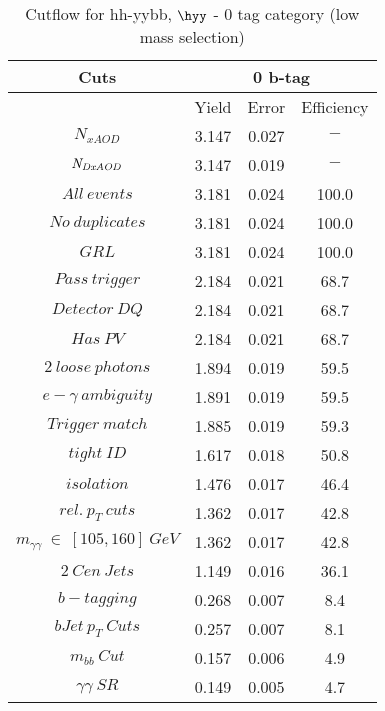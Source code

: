 \begin{table}\footnotesize
\begin{center}
\caption{Cutflow for hh-yybb, $\hyy$ - 0 tag category (low mass selection)}

\begin{tabular}{|c|c|c|c|}
\hline
Cuts& \multicolumn{3}{c|}{0 b-tag} \\ \hline
&Yield&Error&Efficiency\\ \hline
$N_{xAOD}$ & 3.147&0.027 &$-$ \\
\hline
$\it{N}_{DxAOD}$ & 3.147&0.019 &$-$ \\
\hline
$All\ events$ & 3.181&0.024 &100.0 \\
\hline
$No\ duplicates$ & 3.181&0.024 &100.0 \\
\hline
$GRL$ & 3.181&0.024 &100.0 \\
\hline
$Pass\ trigger$ & 2.184&0.021 &68.7 \\
\hline
$Detector\ DQ$ & 2.184&0.021 &68.7 \\
\hline
$Has\ PV$ & 2.184&0.021 &68.7 \\
\hline
$2\ loose\ photons$ & 1.894&0.019 &59.5 \\
\hline
$e-\gamma\ ambiguity$ & 1.891&0.019 &59.5 \\
\hline
$Trigger\ match$ & 1.885&0.019 &59.3 \\
\hline
$tight\ ID$ & 1.617&0.018 &50.8 \\
\hline
$isolation$ & 1.476&0.017 &46.4 \\
\hline
$rel.\ p_{T}\ cuts$ & 1.362&0.017 &42.8 \\
\hline
$m_{\gamma\gamma}\ \in\ [105,160]\ GeV$ & 1.362&0.017 &42.8 \\
\hline
$2\ Cen\ Jets$ & 1.149&0.016 &36.1 \\
\hline
$b-tagging$ & 0.268&0.007 & 8.4 \\
\hline
$bJet\ p_{T}\ Cuts$ & 0.257&0.007 & 8.1 \\
\hline
$m_{bb}\ Cut$ & 0.157&0.006 & 4.9 \\
\hline
$\gamma\gamma\ SR$ & 0.149&0.005 & 4.7 \\
\hline
\end{tabular}
\end{center}
\end{table}
